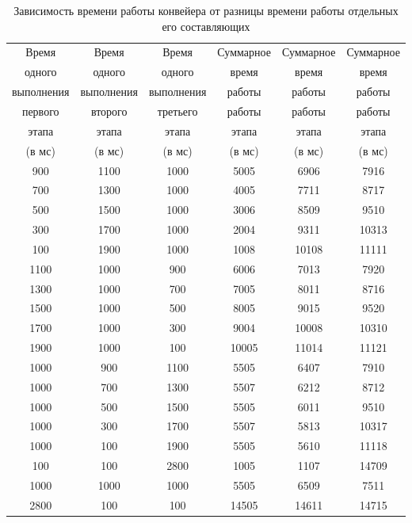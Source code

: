 \documentclass[a4paper, 14pt]{article}
\begin{document}
    \newpage
    \begin{table}[h!]
        \caption{Зависимость времени работы конвейера от разницы времени работы отдельных его составляющих}
            \begin{tabular}{ | c | c | c | c | c | c | }
                \hline
                 Время   &  Время   &  Время  &  Суммарное  & Суммарное  & Суммарное \\
                 одного   &  одного   &  одного  &  время & время &  время \\
                 выполнения   &  выполнения   &  выполнения  & работы & работы & работы  \\ 
                  первого  & второго  & третьего  & работы  & работы & работы  \\ 
                 этапа & этапа & этапа & этапа & этапа & этапа  \\ 
                 (в мс) & (в мс) & (в мс) & (в мс) & (в мс) & (в мс)  \\ 
                 \hline  
                900 & 1100 & 1000 & 5005 & 6906 & 7916  \\
                700 & 1300 & 1000 & 4005 & 7711 & 8717  \\
                500 & 1500 & 1000 & 3006 & 8509 & 9510  \\
                300 & 1700 & 1000 & 2004 & 9311 & 10313 \\
                100 & 1900 & 1000 & 1008 & 10108& 11111 \\
                
                1100 & 1000 & 900 & 6006 & 7013 & 7920  \\
                1300 & 1000 & 700 & 7005 & 8011 & 8716  \\
                1500 & 1000 & 500 & 8005 & 9015 & 9520  \\
                1700 & 1000 & 300 & 9004 & 10008& 10310 \\
                1900 & 1000 & 100 & 10005& 11014& 11121 \\
                
                1000 & 900 & 1100 & 5505 & 6407 & 7910  \\
                1000 & 700 & 1300 & 5507 & 6212 & 8712  \\
                1000 & 500 & 1500 & 5505 & 6011 & 9510  \\
                1000 & 300 & 1700 & 5507 & 5813 & 10317 \\
                1000 & 100 & 1900 & 5505 & 5610 & 11118 \\
                
                100  & 100 & 2800 & 1005 & 1107 & 14709 \\
                1000 & 1000& 1000 & 5505 & 6509 & 7511  \\
                2800 & 100 & 100  & 14505& 14611& 14715 \\
                \hline
            \end{tabular}
        \label{tab:a_b_c}
    \end{table} 
   
\end{document}
